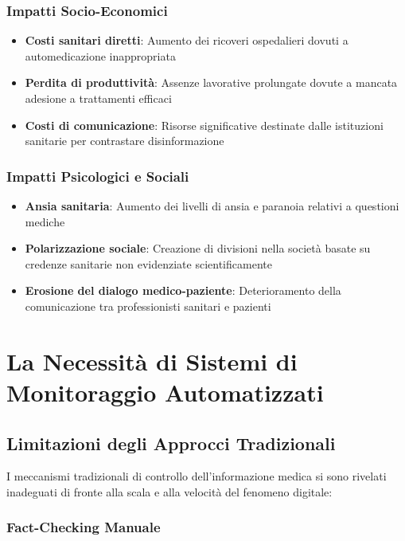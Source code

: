 \documentclass[12pt,a4paper]{report}
\begin{document}
\subsubsection{Impatti Socio-Economici}

\begin{itemize}
    \item \textbf{Costi sanitari diretti}: Aumento dei ricoveri ospedalieri dovuti a automedicazione inappropriata
    \item \textbf{Perdita di produttività}: Assenze lavorative prolungate dovute a mancata adesione a trattamenti efficaci
    \item \textbf{Costi di comunicazione}: Risorse significative destinate dalle istituzioni sanitarie per contrastare disinformazione
\end{itemize}

\subsubsection{Impatti Psicologici e Sociali}

\begin{itemize}
    \item \textbf{Ansia sanitaria}: Aumento dei livelli di ansia e paranoia relativi a questioni mediche
    \item \textbf{Polarizzazione sociale}: Creazione di divisioni nella società basate su credenze sanitarie non evidenziate scientificamente
    \item \textbf{Erosione del dialogo medico-paziente}: Deterioramento della comunicazione tra professionisti sanitari e pazienti
\end{itemize}

\section{La Necessità di Sistemi di Monitoraggio Automatizzati}

\subsection{Limitazioni degli Approcci Tradizionali}

I meccanismi tradizionali di controllo dell'informazione medica si sono rivelati inadeguati di fronte alla scala e alla velocità del fenomeno digitale:

\subsubsection{Fact-Checking Manuale}
\end{document}
